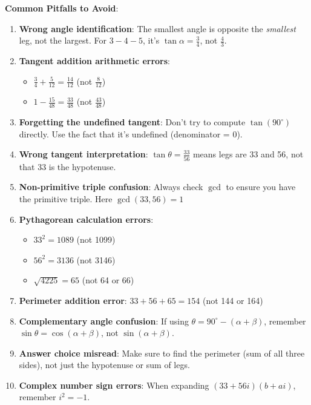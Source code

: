 \documentclass[12pt]{article}
\begin{document}
\begin{warningbox}
\textbf{Common Pitfalls to Avoid}:

\begin{enumerate}
    \item \textbf{Wrong angle identification}: The smallest angle is opposite the \textit{smallest} leg, not the largest. For $3-4-5$, it's $\tan\alpha = \frac{3}{4}$, not $\frac{4}{3}$.
    
    \item \textbf{Tangent addition arithmetic errors}: 
    \begin{itemize}
        \item $\frac{3}{4} + \frac{5}{12} = \frac{14}{12}$ (not $\frac{8}{12}$)
        \item $1 - \frac{15}{48} = \frac{33}{48}$ (not $\frac{43}{48}$)
    \end{itemize}
    
    \item \textbf{Forgetting the undefined tangent}: Don't try to compute $\tan(90^{\circ})$ directly. Use the fact that it's undefined (denominator = 0).
    
    \item \textbf{Wrong tangent interpretation}: $\tan\theta = \frac{33}{56}$ means legs are 33 and 56, not that 33 is the hypotenuse.
    
    \item \textbf{Non-primitive triple confusion}: Always check $\gcd$ to ensure you have the primitive triple. Here $\gcd(33, 56) = 1$ \checkmark
    
    \item \textbf{Pythagorean calculation errors}:
    \begin{itemize}
        \item $33^2 = 1089$ (not 1099)
        \item $56^2 = 3136$ (not 3146)
        \item $\sqrt{4225} = 65$ (not 64 or 66)
    \end{itemize}
    
    \item \textbf{Perimeter addition error}: $33 + 56 + 65 = 154$ (not 144 or 164)
    
    \item \textbf{Complementary angle confusion}: If using $\theta = 90^{\circ} - (\alpha + \beta)$, remember $\sin\theta = \cos(\alpha + \beta)$, not $\sin(\alpha + \beta)$.
    
    \item \textbf{Answer choice misread}: Make sure to find the perimeter (sum of all three sides), not just the hypotenuse or sum of legs.
    
    \item \textbf{Complex number sign errors}: When expanding $(33 + 56i)(b + ai)$, remember $i^2 = -1$.
\end{enumerate}
\end{warningbox}
\end{document}
